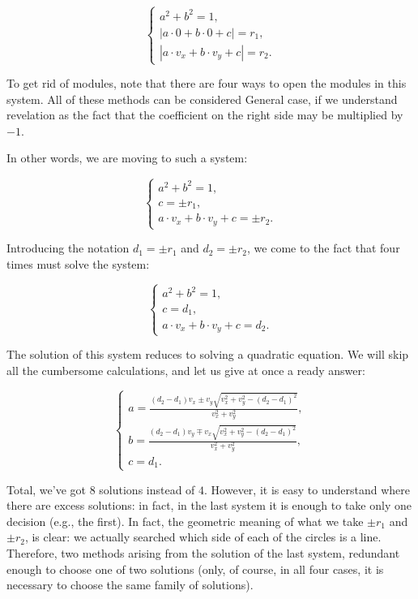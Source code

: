$$ \begin{cases}
a^2 + b^2 = 1, \\
| a \cdot 0 + b \cdot 0 + c | = r_1, \\
| a \cdot v_x + b \cdot v_y + c | = r_2.
\end{cases} $$

To get rid of modules, note that there are four ways to open the modules in this system. All of these methods can be considered General case, if we understand revelation as the fact that the coefficient on the right side may be multiplied by $-1$.

In other words, we are moving to such a system:

$$ \begin{cases}
a^2 + b^2 = 1, \\
c = \pm r_1, \\
a \cdot v_x + b \cdot v_y + c = \pm r_2.
\end{cases} $$

Introducing the notation $d_1 = \pm r_1$ and $d_2 = \pm r_2$, we come to the fact that four times must solve the system:

$$ \begin{cases}
a^2 + b^2 = 1, \\
c = d_1, \\
a \cdot v_x + b \cdot v_y + c = d_2.
\end{cases} $$

The solution of this system reduces to solving a quadratic equation. We will skip all the cumbersome calculations, and let us give at once a ready answer:

$$ \begin{cases}
a = \frac{ (d_2-d_1)v_x \pm v_y \sqrt{ v_x^2 + v_y^2 - (d_2-d_1)^2 } }{ v_x^2 + v_y^2 }, \\
b = \frac{ (d_2-d_1)v_y \mp v_x \sqrt{ v_x^2 + v_y^2 - (d_2-d_1)^2 } }{ v_x^2 + v_y^2 }, \\
c = d_1.
\end{cases} $$

Total, we've got $8$ solutions instead of $4$. However, it is easy to understand where there are excess solutions: in fact, in the last system it is enough to take only one decision (e.g., the first). In fact, the geometric meaning of what we take $\pm r_1$ and $\pm r_2$, is clear: we actually searched which side of each of the circles is a line. Therefore, two methods arising from the solution of the last system, redundant enough to choose one of two solutions (only, of course, in all four cases, it is necessary to choose the same family of solutions).

